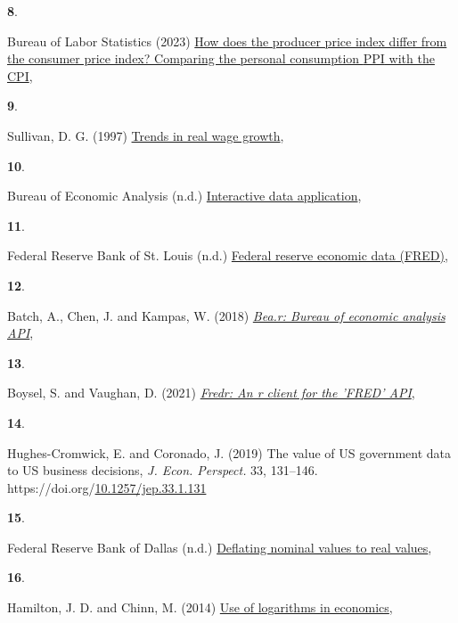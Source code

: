 \documentclass[
  10pt,
  letterpaper,
  DIV=11,
  numbers=noendperiod]{scrartcl}
\newlength{\cslhangindent}
\newlength{\csllabelwidth}
\newenvironment{CSLReferences}[2] %
 {\begin{list}{}{%
  \setlength{\itemindent}{0pt}
  \setlength{\leftmargin}{0pt}
  \setlength{\parsep}{0pt}
  \ifodd #1
   \setlength{\leftmargin}{\cslhangindent}
   \setlength{\itemindent}{-1\cslhangindent}
  \fi
  \setlength{\itemsep}{#2\baselineskip}}}
 {\end{list}}
\newcommand{\CSLLeftMargin}[1]{\parbox[t]{\csllabelwidth}{\strut#1\strut}}
\newcommand{\CSLRightInline}[1]{\parbox[t]{\linewidth - \csllabelwidth}{\strut#1\strut}}
\begin{document}
\begin{CSLReferences}{1}{0}
\CSLLeftMargin{\textbf{8}. }%
\CSLRightInline{Bureau of Labor Statistics (2023)
\href{https://www.bls.gov/ppi/methodology-reports/comparing-the-producer-price-index-for-personal-consumption-with-the-us-all-items-cpi-for-all-urban-consumers.htm}{How
does the producer price index differ from the consumer price index?
Comparing the personal consumption {PPI} with the {CPI}}, }

\CSLLeftMargin{\textbf{9}. }%
\CSLRightInline{Sullivan, D. G. (1997)
\href{https://www.chicagofed.org/publications/chicago-fed-letter/1997/march-115}{Trends
in real wage growth}, }

\CSLLeftMargin{\textbf{10}. }%
\CSLRightInline{Bureau of Economic Analysis (n.d.)
\href{https://www.bea.gov/itable}{Interactive data application}, }

\CSLLeftMargin{\textbf{11}. }%
\CSLRightInline{Federal Reserve Bank of St. Louis (n.d.)
\href{https://fred.stlouisfed.org/}{Federal reserve economic data
(FRED)}, }

\CSLLeftMargin{\textbf{12}. }%
\CSLRightInline{Batch, A., Chen, J. and Kampas, W. (2018)
\emph{\href{https://CRAN.R-project.org/package=bea.R}{Bea.r: Bureau of
economic analysis API}}, }

\CSLLeftMargin{\textbf{13}. }%
\CSLRightInline{Boysel, S. and Vaughan, D. (2021)
\emph{\href{https://CRAN.R-project.org/package=fredr}{Fredr: An r client
for the 'FRED' API}}, }

\CSLLeftMargin{\textbf{14}. }%
\CSLRightInline{Hughes-Cromwick, E. and Coronado, J. (2019) The value of
{US} government data to {US} business decisions, \emph{J. Econ.
Perspect.} 33, 131--146.
https://doi.org/\href{https://doi.org/10.1257/jep.33.1.131}{10.1257/jep.33.1.131}}

\CSLLeftMargin{\textbf{15}. }%
\CSLRightInline{Federal Reserve Bank of Dallas (n.d.)
\href{https://www.dallasfed.org/research/basics/nominal}{Deflating
nominal values to real values}, }

\CSLLeftMargin{\textbf{16}. }%
\CSLRightInline{Hamilton, J. D. and Chinn, M. (2014)
\href{https://econbrowser.com/archives/2014/02/use-of-logarithms-in-economics}{Use
of logarithms in economics}, }


\end{CSLReferences}
\end{document}
